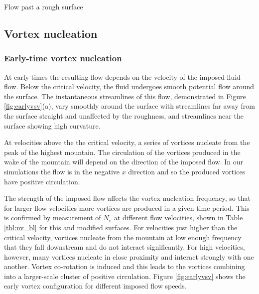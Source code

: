 \begin{chapter}{\label{cha:afm}Flow past a rough surface}
\subsection{Vortex nucleation}
\subsubsection{Early-time vortex nucleation}
At early times the resulting flow depends on the velocity of the imposed fluid flow. Below the critical velocity, the fluid undergoes smooth potential flow around the surface. The instantaneous streamlines of this flow, demonstrated in Figure \ref{fig:earlyvsv}(a), vary smoothly around the surface with streamlines far away from the surface straight and unaffected by the roughness, and streamlines near the surface showing high curvature.

At velocities above the the critical velocity, a series of vortices nucleate from the peak of the highest mountain. The circulation of the vortices produced in the wake of the mountain will depend on the direction of the imposed flow. In our simulations the flow is in the negative $x$ direction and so the produced vortices have positive circulation.

The strength of the imposed flow affects the vortex nucleation frequency, so that for larger flow velocities more vortices are produced in a given time period. This is confirmed by measurement of $N_v$ at different flow velocities, shown in Table \ref{tbl:nv_bl} for this and modified surfaces. For velocities just higher than the critical velocity, vortices nucleate from the mountain at low enough frequency that they fall downstream and do not interact significantly. For high velocities, however, many vortices nucleate in close proximity and interact strongly with one another. Vortex co-rotation is induced and this leads to the vortices combining into a larger-scale cluster of positive circulation. Figure \ref{fig:earlyvsv} shows the early vortex configuration for different imposed flow speeds. 


\end{chapter}
